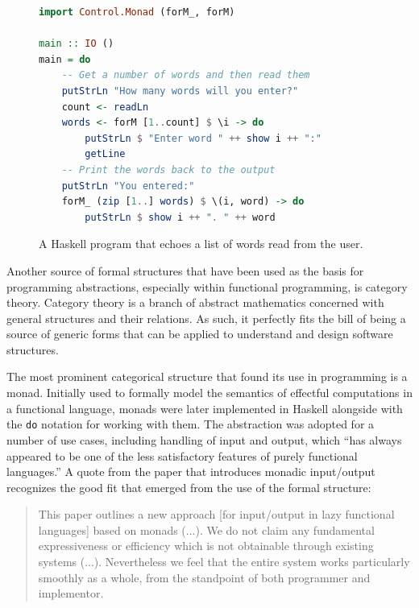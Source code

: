 \begin{figure}
\centering
\vspace{-1em}
\begin{minipage}[t]{.5\textwidth}%
\begin{lstlisting}[language=haskell]
import Control.Monad (forM_, forM)

main :: IO ()
main = do
    -- Get a number of words and then read them
    putStrLn "How many words will you enter?"
    count <- readLn
    words <- forM [1..count] $ \i -> do
        putStrLn $ "Enter word " ++ show i ++ ":"
        getLine
    -- Print the words back to the output
    putStrLn "You entered:"
    forM_ (zip [1..] words) $ \(i, word) -> do
        putStrLn $ show i ++ ". " ++ word
\end{lstlisting}
\end{minipage}
\vspace{-0.5em}
\caption{A Haskell program that echoes a list of words read from the user.}
\label{fig:monads}
\vspace{-0.5em}
\end{figure}

Another source of formal structures that have been used as the basis for programming
abstractions, especially within functional programming, is category theory. Category theory
is a branch of abstract mathematics concerned with general structures and their relations.
As such, it perfectly fits the bill of being a source of generic forms that can be applied
to understand and design software structures.

The most prominent categorical structure that found its use in programming
is a monad. Initially used to formally model the semantics of effectful computations in a
functional language, monads were later implemented in Haskell alongside with the
\texttt{do} notation for working with them. The abstraction was adopted for a number of
use cases, including handling of input and output, which ``has always appeared to be one of
the less satisfactory features of purely functional languages.''
A quote from the paper that introduces monadic input/output recognizes the good fit
that emerged from the use of the formal structure:

\begin{quote}
This paper outlines a new approach [for input/output in lazy functional languages]
based on monads (...). We do not claim any fundamental expressiveness or efficiency
which is not obtainable through existing systems (...). Nevertheless we feel
that the entire system works particularly smoothly as a whole, from the standpoint
of both programmer and implementor.
\end{quote}


